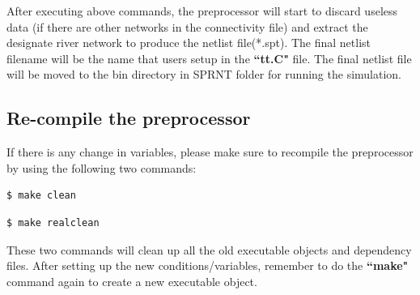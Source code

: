 \documentclass[12pt, letterpaper]{article}
\begin{document}
\begin{appendices}
\begin{flushleft}
After executing above commands, the preprocessor will start to discard useless data (if there are other networks in the connectivity file) and extract the designate river network to produce the netlist file(*.spt). The final netlist filename will be the name that users setup in the \textbf{``tt.C"} file.
\newline
\newline
The final netlist file will be moved to the bin directory in SPRNT folder for running the simulation.
%
%
%

\subsection*{Re-compile the preprocessor}

If there is any change in variables, please make sure to recompile the preprocessor by using the following two commands:

\begin{lstlisting}[frame=single]
$ make clean
\end{lstlisting}


\begin{lstlisting}[frame=single]
$ make realclean
\end{lstlisting}

These two commands will clean up all the old executable objects and dependency files. After setting up the new conditions/variables, remember to do the \textbf{``make"} command again to create a new executable object.

\end{flushleft} %


\end{appendices}
\end{document}
